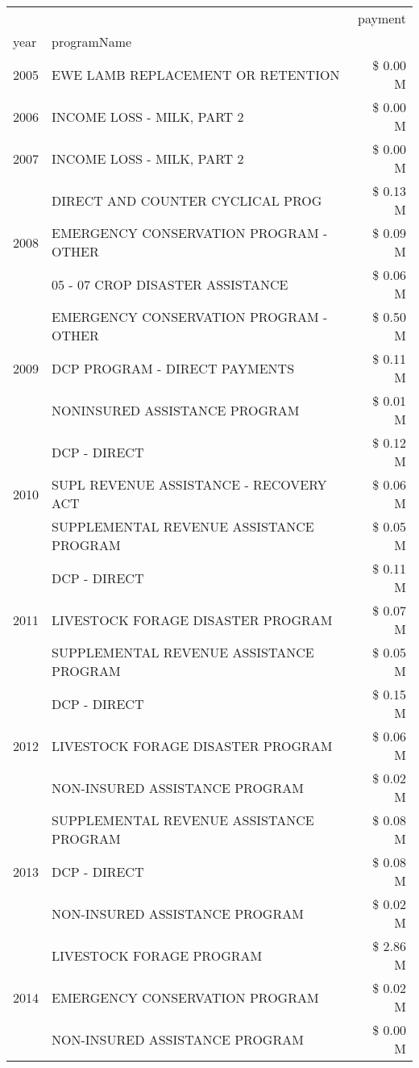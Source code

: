 \begin{tabular}{llr}
\toprule
 &  & payment \\
year & programName &  \\
\midrule
2005 & EWE LAMB REPLACEMENT OR RETENTION & \$ 0.00 M \\
\cline{1-3}
2006 & INCOME LOSS - MILK, PART 2 & \$ 0.00 M \\
\cline{1-3}
2007 & INCOME LOSS - MILK, PART 2 & \$ 0.00 M \\
\cline{1-3}
\multirow[t]{3}{*}{2008} & DIRECT AND COUNTER CYCLICAL PROG & \$ 0.13 M \\
 & EMERGENCY CONSERVATION PROGRAM - OTHER & \$ 0.09 M \\
 & 05 - 07 CROP DISASTER ASSISTANCE & \$ 0.06 M \\
\cline{1-3}
\multirow[t]{3}{*}{2009} & EMERGENCY CONSERVATION PROGRAM - OTHER & \$ 0.50 M \\
 & DCP PROGRAM - DIRECT PAYMENTS & \$ 0.11 M \\
 & NONINSURED ASSISTANCE PROGRAM & \$ 0.01 M \\
\cline{1-3}
\multirow[t]{3}{*}{2010} & DCP - DIRECT & \$ 0.12 M \\
 & SUPL REVENUE ASSISTANCE - RECOVERY ACT & \$ 0.06 M \\
 & SUPPLEMENTAL REVENUE ASSISTANCE PROGRAM & \$ 0.05 M \\
\cline{1-3}
\multirow[t]{3}{*}{2011} & DCP - DIRECT & \$ 0.11 M \\
 & LIVESTOCK FORAGE DISASTER PROGRAM & \$ 0.07 M \\
 & SUPPLEMENTAL REVENUE ASSISTANCE PROGRAM & \$ 0.05 M \\
\cline{1-3}
\multirow[t]{3}{*}{2012} & DCP - DIRECT & \$ 0.15 M \\
 & LIVESTOCK FORAGE DISASTER PROGRAM & \$ 0.06 M \\
 & NON-INSURED ASSISTANCE PROGRAM & \$ 0.02 M \\
\cline{1-3}
\multirow[t]{3}{*}{2013} & SUPPLEMENTAL REVENUE ASSISTANCE PROGRAM & \$ 0.08 M \\
 & DCP - DIRECT & \$ 0.08 M \\
 & NON-INSURED ASSISTANCE PROGRAM & \$ 0.02 M \\
\cline{1-3}
\multirow[t]{3}{*}{2014} & LIVESTOCK FORAGE PROGRAM & \$ 2.86 M \\
 & EMERGENCY CONSERVATION PROGRAM & \$ 0.02 M \\
 & NON-INSURED ASSISTANCE PROGRAM & \$ 0.00 M \\

\end{tabular}
